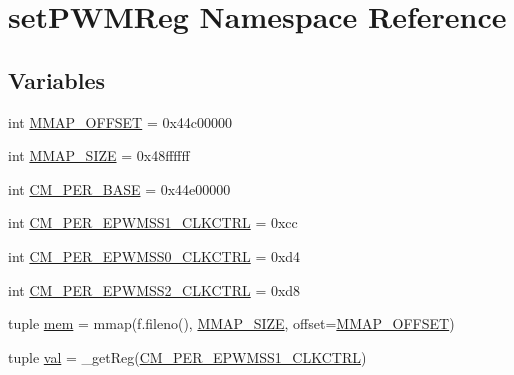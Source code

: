\hypertarget{namespaceset_p_w_m_reg}{\section{set\-P\-W\-M\-Reg \-Namespace \-Reference}
\label{namespaceset_p_w_m_reg}
}
\subsection*{\-Variables}
\begin{DoxyCompactItemize}
\item 
int \hyperlink{namespaceset_p_w_m_reg_a06a96f5d3655051e8480d21c0fbb628b}{\-M\-M\-A\-P\-\_\-\-O\-F\-F\-S\-E\-T} = 0x44c00000
\item 
int \hyperlink{namespaceset_p_w_m_reg_a623132b666b04c9f871f6af5afe56a74}{\-M\-M\-A\-P\-\_\-\-S\-I\-Z\-E} = 0x48ffffff
\item 
int \hyperlink{namespaceset_p_w_m_reg_ab8f2462f42793340c5d2b2fd7087ddf1}{\-C\-M\-\_\-\-P\-E\-R\-\_\-\-B\-A\-S\-E} = 0x44e00000
\item 
int \hyperlink{namespaceset_p_w_m_reg_a859724bfd4003c6d9a866b8787264da5}{\-C\-M\-\_\-\-P\-E\-R\-\_\-\-E\-P\-W\-M\-S\-S1\-\_\-\-C\-L\-K\-C\-T\-R\-L} = 0xcc
\item 
int \hyperlink{namespaceset_p_w_m_reg_a87e7e30380448b8f54179817ad0e5983}{\-C\-M\-\_\-\-P\-E\-R\-\_\-\-E\-P\-W\-M\-S\-S0\-\_\-\-C\-L\-K\-C\-T\-R\-L} = 0xd4
\item 
int \hyperlink{namespaceset_p_w_m_reg_a98401dab9ef3fd3cd91cbe23a595e589}{\-C\-M\-\_\-\-P\-E\-R\-\_\-\-E\-P\-W\-M\-S\-S2\-\_\-\-C\-L\-K\-C\-T\-R\-L} = 0xd8
\item 
tuple \hyperlink{namespaceset_p_w_m_reg_a6b375e159326fb3187b384ae323a07aa}{mem} = mmap(f.\-fileno(), \hyperlink{namespaceset_p_w_m_reg_a623132b666b04c9f871f6af5afe56a74}{\-M\-M\-A\-P\-\_\-\-S\-I\-Z\-E}, offset=\hyperlink{namespaceset_p_w_m_reg_a06a96f5d3655051e8480d21c0fbb628b}{\-M\-M\-A\-P\-\_\-\-O\-F\-F\-S\-E\-T})
\item 
tuple \hyperlink{namespaceset_p_w_m_reg_ad3cd16cb2c1d30a09867a4ba55ed109b}{val} = \-\_\-get\-Reg(\hyperlink{namespaceset_p_w_m_reg_a859724bfd4003c6d9a866b8787264da5}{\-C\-M\-\_\-\-P\-E\-R\-\_\-\-E\-P\-W\-M\-S\-S1\-\_\-\-C\-L\-K\-C\-T\-R\-L})
\end{DoxyCompactItemize}


